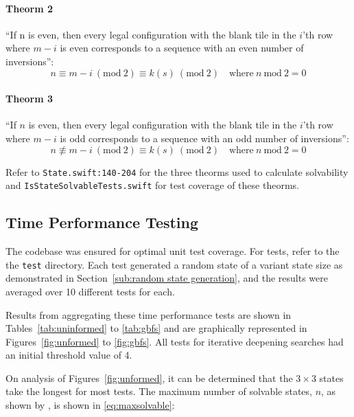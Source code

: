 \paragraph{Theorm 2}
\label{par:Theorm 2}

``If n is even, then every legal configuration with the blank tile in the
$i$'th row where $m-i$ is even corresponds to a sequence with an even
number of inversions'':
\begin{equation}
  n \equiv m-i \ (\text{mod}\ 2) \equiv k(s) \ (\text{mod}\ 2) \quad \text{where} \ n \ \text{mod} \ 2 = 0
\end{equation}

\paragraph{Theorm 3}
\label{par:Theorm 3}

``If $n$ is even, then every legal configuration with the blank tile in the
$i$'th row where $m-i$ is odd corresponds to a sequence with an odd
number of inversions'':
\begin{equation}
  n \not\equiv m-i \ (\text{mod}\ 2) \equiv k(s) \ (\text{mod}\ 2) \quad \text{where} \ n \ \text{mod} \ 2 = 0
\end{equation}

Refer to
\texttt{State.swift:140-204} for the three theorms used to calculate solvability
and \texttt{IsStateSolvableTests.swift} for test coverage of these theorms.

\subsection{Time Performance Testing}
\label{sub:time performance tests}

The codebase was ensured for optimal unit test coverage. For tests, refer to
the the \texttt{test} directory. Each test generated a random state of a variant
state size as demonstrated in Section~\ref{sub:random state generation}, and the
results were averaged over 10 different tests for each.

Results from aggregating these time performance tests are
shown in Tables~\ref{tab:uninformed} to \ref{tab:gbfs} and are graphically
represented in Figures~\ref{fig:unformed} to \ref{fig:gbfs}. All tests for
iterative deepening searches had an initial threshold value of 4.

On analysis of Figures~\ref{fig:unformed}, it can be determined that the $3 \times 3$
states take the longest for most tests. The maximum number of solvable states,
$n$, as shown by \citet{gong2000}, is shown in \ref{eq:maxsolvable}:

